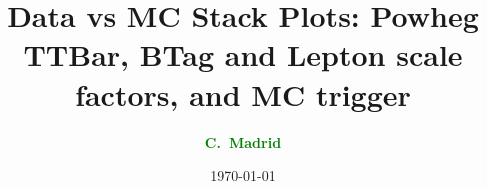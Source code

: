 \documentclass[10pt,xcolor=svgnames,fleqn,aspectratio=169]{beamer}
\title{Data vs MC Stack Plots: Powheg TTBar, BTag and Lepton scale factors, and MC trigger}
\author{\textcolor{Green}{\bf C.~Madrid\inst{1}}}
\institute{\inst{1} Baylor}
\date{\today}
\begin{document}
\begin{frame}[plain]
\maketitle
\end{frame}





\end{document}
